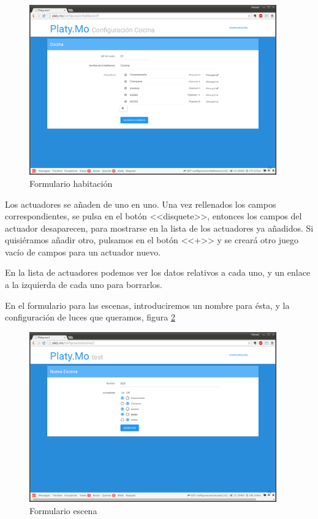         \begin{figure}[h!]
            \centering
            \includegraphics[width=0.95\textwidth]{imagenes/conf_hab.png}
            \caption{Formulario habitación}
            \label{fig:form_hab}
        \end{figure}
        
     Los actuadores se añaden de uno en uno. Una vez rellenados los campos correspondientes, se pulsa en el botón <<disquete>>, entonces los campos del actuador desaparecen, para mostrarse en la lista de los actuadores ya añadidos. Si quisiéramos añadir otro, pulsamos en el botón <<+>> y se creará otro juego vacío de campos para un actuador nuevo.
     
     En la lista de actuadores podemos ver los datos relativos a cada uno, y un enlace a la izquierda de cada uno para borrarlos.
     
          
     En el formulario para las escenas, introduciremos un nombre para ésta, y la configuración de luces que queramos, figura \ref{fig:form_esc}
    
    \begin{figure}[h!]
        \centering
        \includegraphics[width=0.95\textwidth]{imagenes/conf_esc.png}
        \caption{Formulario escena}
        \label{fig:form_esc}
    \end{figure}
    
